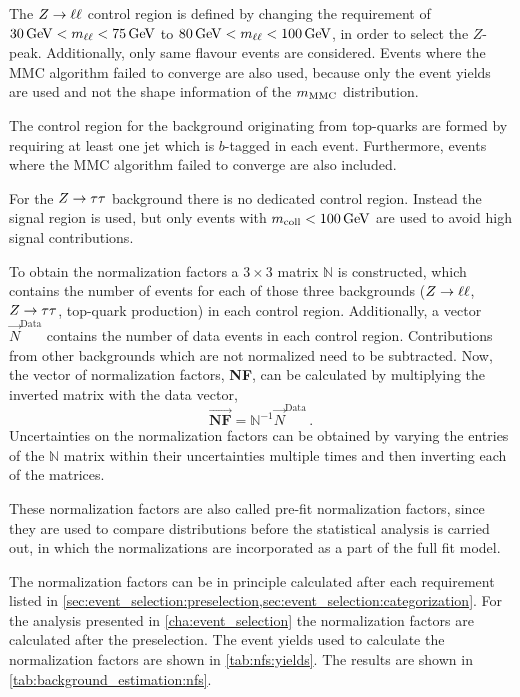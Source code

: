 The $Z \to \ell \ell$ control region is defined by changing the requirement of $\SI{30}{\GeV} < \mll < \SI{75}{\GeV}$ to $\SI{80}{\GeV} < \mll < \SI{100}{\GeV}$, in order to
select the $Z$-peak. Additionally, only same flavour events are considered.
Events where the MMC algorithm failed to converge are also used, because only the event yields are used and not the shape information
of the $m_\text{MMC}$ distribution.

The control region for the background originating from top-quarks are formed by requiring at least one jet which is $b$-tagged in each event.
Furthermore, events where the MMC algorithm failed to converge are also included.

For the $Z \to \tau \tau$ background there is no dedicated control region.
Instead the signal region is used, but only events with $\mcoll < \SI{100}{\GeV}$ are used to avoid high signal contributions.

To obtain the normalization factors a $3 \times 3$ matrix $\mathbb{N}$ is constructed, which contains the number of events for each of those three backgrounds
($Z \to \ell \ell$, $Z \to \tau \tau$, top-quark production)
in each control region.
Additionally, a vector $\vec{N}^\text{Data}$ contains the number of data events in each control region.
Contributions from other backgrounds which are not normalized need to be subtracted.
Now, the vector of normalization factors, \textbf{NF}, can be calculated by multiplying the inverted matrix with the data vector,
\begin{equation}
    \vec{\textbf{NF}} = \mathbb{N}^{-1} \vec{N}^\text{Data} \,.
\end{equation}
Uncertainties on the normalization factors can be obtained by varying the entries of the $\mathbb{N}$ matrix within their uncertainties multiple times and then
inverting each of the matrices.

These normalization factors are also called pre-fit normalization factors, since they are used to compare distributions
before the statistical analysis is carried out, in which the normalizations are incorporated as a part of the full fit model.

The normalization factors can be in principle calculated after each requirement listed in \cref{sec:event_selection:preselection,sec:event_selection:categorization}.
For the analysis presented in \cref{cha:event_selection} the normalization factors are calculated after the preselection.
The event yields used to calculate the normalization factors are shown in \cref{tab:nfs:yields}.
The results are shown in \cref{tab:background_estimation:nfs}.

